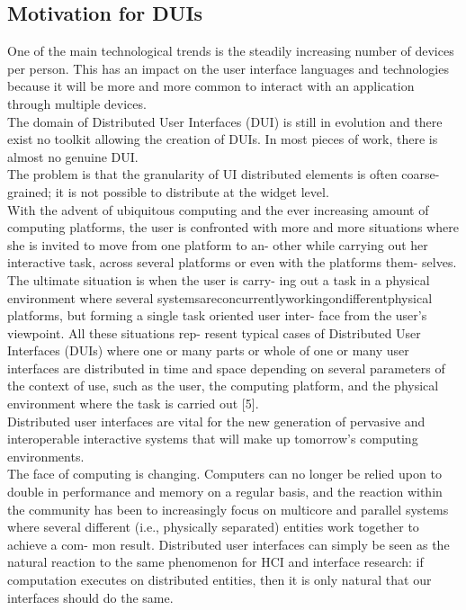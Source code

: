 \subsection{Motivation for DUIs}

\cite{manca2011distributing} One of the main technological trends is the
steadily increasing number of devices per person. This has an impact on the user
interface languages and technologies because it will be more and more common to
interact with an application through multiple devices.\\

\cite{melchior2011distribution}The domain of Distributed User Interfaces (DUI) is still in evolution and there exist no toolkit allowing the creation of DUIs.
In most pieces of work, there is almost no genuine DUI. \\

\cite{melchior2011distribution}The problem is that the granularity of UI
distributed elements is often coarse-grained; it is not possible to distribute
at the widget level.\\

\cite{demeure20084c}
With the advent of ubiquitous computing and the ever increasing amount of computing platforms, the user is confronted with more and more situations where she is invited to move from one platform to an- other
while carrying out her interactive task, across several platforms or even with
the platforms them- selves. The ultimate situation is when the user is carry-
ing out a task in a physical environment where several systemsareconcurrentlyworkingondifferentphysical platforms, but forming a single task oriented user inter- face from the user’s viewpoint. All these situations rep- resent typical cases of Distributed User Interfaces (DUIs) where one or many parts or whole of one or many user interfaces are distributed in time and space depending on several parameters of the context of use, such as the user, the computing platform, and the physical environment where the task is carried out [5].\\

\cite{elmqvist2011distributed}Distributed user interfaces are vital for the new
generation of pervasive and interoperable interactive systems that will make up tomorrow’s computing environments. \\

\cite{elmqvist2011distributed}The face of computing is changing. Computers can
no longer be relied upon to double in performance and memory on a regular basis, and the reaction within the
community has been to increasingly focus on multicore and parallel systems where
several different (i.e., physically separated) entities work together to achieve
a com- mon result. Distributed user interfaces can simply be seen as the natural
reaction to the same phenomenon for HCI and interface research: if computation
executes on distributed entities, then it is only natural that our interfaces
should do the same. \\


